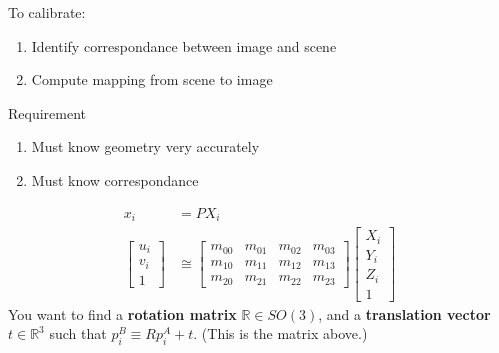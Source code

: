 \documentclass[10pt]{article}
\begin{document}
To calibrate:
\begin{enumerate}
    \item Identify correspondance between image and scene
    \item Compute mapping from scene to image
\end{enumerate}
Requirement
\begin{enumerate}
    \item Must know geometry very accurately
    \item Must know correspondance
\end{enumerate}
\begin{align*}
    x_i &= PX_i \\
    \begin{bmatrix} u_i \\ v_i \\ 1 \end{bmatrix} &\cong \begin{bmatrix} m_{00} & m_{01} & m_{02} & m_{03} \\ m_{10} & m_{11} & m_{12} & m_{13} \\ m_{20} & m_{21} & m_{22} & m_{23} \end{bmatrix} \begin{bmatrix} X_i \\ Y_i \\ Z_i \\ 1 \end{bmatrix}
\end{align*}
You want to find a \textbf{rotation matrix} $\mathbb{R} \in SO(3)$, and a \textbf{translation vector} $t \in \mathbb{R}^3$ such that $p_i^B \equiv Rp_i^A + t$.  (This is the matrix above.)
\end{document}
